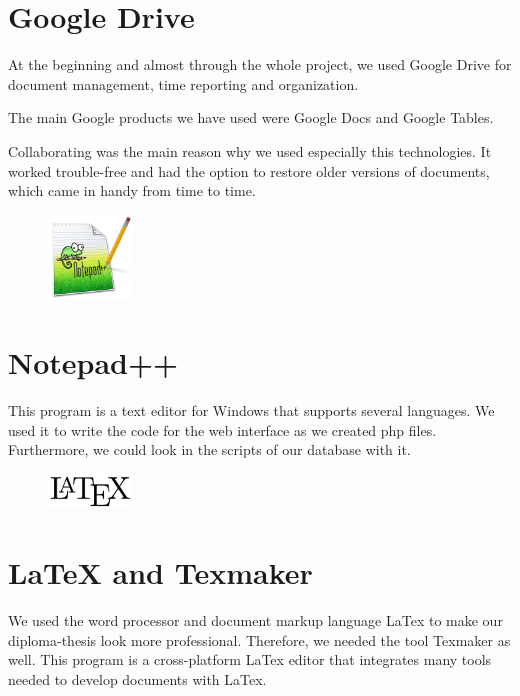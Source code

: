 \section{Google Drive}
At the beginning and almost through the whole project, we used Google Drive for document management, time reporting and organization.

The main Google products we have used were Google Docs and Google Tables.

Collaborating was the main reason why we used especially this technologies. It worked trouble-free and had the option to restore older versions of documents, which came in handy from time to time.
\begin{figure}
  \begin{center}
    \includegraphics[width=0.2\textwidth] {bilder/Notepad}
  \end{center}
\end{figure}
\section{Notepad++}
This program is a text editor for Windows that supports several languages. We used it to write the code for the web interface as we created \gls{php} files. Furthermore, we could look in the scripts of our database with it.

\begin{figure}
  \begin{center}
    \includegraphics[width=0.2\textwidth] {bilder/LaTeX}
  \end{center}
\end{figure}
\section{LaTeX and Texmaker}
We used the word processor and document markup language LaTex to make our diploma-thesis look more professional. Therefore, we needed the tool Texmaker as well. This program is a cross-platform LaTex editor that integrates many tools needed to develop documents with LaTex.

